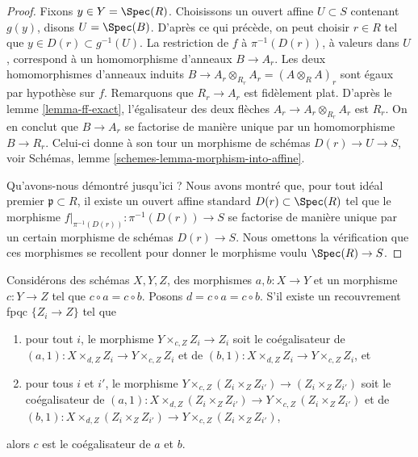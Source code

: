 \begin{proof}
\medskip\noindent
Fixons $y \in Y = \Spec(R)$. Choisissons un ouvert affine $U \subset S$
contenant $g(y)$, disons $U = \Spec(B)$.
D'après ce qui précède, on peut choisir $r \in R$ tel que
$y \in D(r) \subset g^{-1}(U)$.
La restriction de $f$ à $\pi^{-1}(D(r))$, à valeurs dans $U$, correspond à un
homomorphisme d'anneaux $B \to A_r$. Les deux homomorphismes d'anneaux induits
$B \to A_r \otimes_{R_r} A_r = (A \otimes_R A)_r$ sont égaux par hypothèse
sur $f$. Remarquons que $R_r \to A_r$ est fidèlement plat.
D'après le lemme \ref{lemma-ff-exact}, l'égalisateur des deux flèches
$A_r \to A_r \otimes_{R_r} A_r$ est $R_r$.
On en conclut que $B \to A_r$ se factorise de manière unique par un
homomorphisme $B \to R_r$. Celui-ci donne à son tour un morphisme de schémas
$D(r) \to U \to S$, voir Schémas, lemme
\ref{schemes-lemma-morphism-into-affine}.

\medskip\noindent
Qu'avons-nous démontré jusqu'ici ? Nous avons montré que, pour tout idéal
premier $\mathfrak p \subset R$, il existe un ouvert affine standard
$D(r) \subset \Spec(R)$ tel que le morphisme
$f|_{\pi^{-1}(D(r))} : \pi^{-1}(D(r)) \to S$ se factorise de manière unique
par un certain morphisme de schémas $D(r) \to S$.
Nous omettons la vérification que ces morphismes se recollent pour donner le
morphisme voulu $\Spec(R) \to S$.
\end{proof}

\begin{lemma}
\label{lemma-coequalizer-fpqc-local}
Considérons des schémas $X, Y, Z$, des morphismes $a, b : X \to Y$ et un
morphisme $c : Y \to Z$ tel que $c \circ a = c \circ b$. Posons
$d = c \circ a = c \circ b$. S'il existe un recouvrement fpqc
$\{Z_i \to Z\}$ tel que
\begin{enumerate}
\item pour tout $i$, le morphisme $Y \times_{c, Z} Z_i \to Z_i$ soit le
coégalisateur de $(a, 1) : X \times_{d, Z} Z_i \to Y \times_{c, Z} Z_i$ et de
$(b, 1) : X \times_{d, Z} Z_i \to Y \times_{c, Z} Z_i$, et
\item pour tous $i$ et $i'$, le morphisme
$Y \times_{c, Z} (Z_i \times_Z Z_{i'}) \to (Z_i \times_Z Z_{i'})$ soit le
coégalisateur de
$(a, 1) : X \times_{d, Z} (Z_i \times_Z Z_{i'}) \to
Y \times_{c, Z} (Z_i \times_Z Z_{i'})$ et de
$(b, 1) : X \times_{d, Z} (Z_i \times_Z Z_{i'}) \to
Y \times_{c, Z} (Z_i \times_Z Z_{i'})$,
\end{enumerate}
alors $c$ est le coégalisateur de $a$ et $b$.
\end{lemma}

